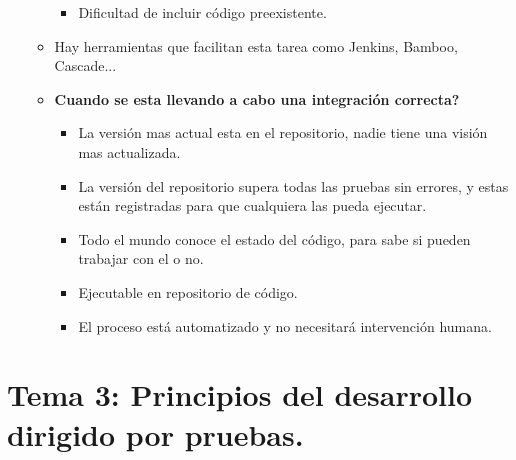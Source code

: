 \documentclass[12pt, twoside, openright]{report} %
\begin{document}
\begin{itemize}
\begin{itemize}
\begin{itemize}
    \item Dificultad de incluir código preexistente.
      
    \end{itemize}
  \item Hay herramientas que facilitan esta tarea como Jenkins, Bamboo,
    Cascade...
    
  \item \textbf{Cuando se esta llevando a cabo una integración correcta?}
    

    \begin{itemize}
    \item La versión mas actual esta en el repositorio, nadie tiene una
      visión mas actualizada.
      
    \item La versión del repositorio supera todas las pruebas sin errores, y
      estas están registradas para que cualquiera las pueda ejecutar.
      
    \item Todo el mundo conoce el estado del código, para sabe si pueden
      trabajar con el o no.
      
    \item Ejecutable en repositorio de código.
      
    \item El proceso está automatizado y no necesitará intervención humana.
      
    \end{itemize}
  \end{itemize}
\end{itemize}
\chapter{Tema 3: Principios del desarrollo dirigido por pruebas.}
\end{document}
